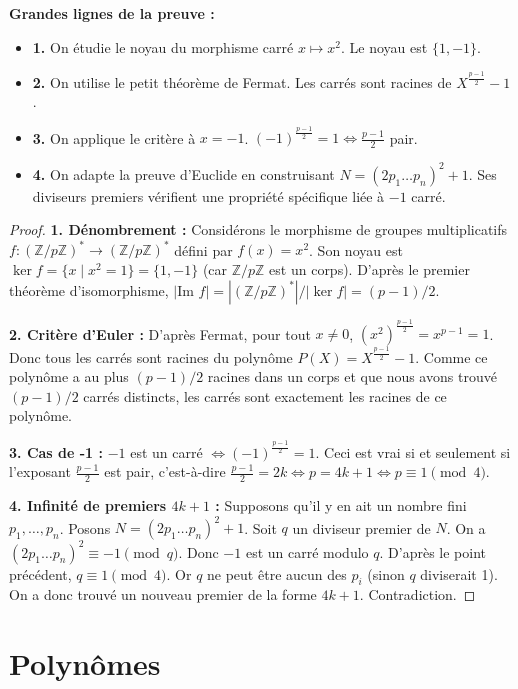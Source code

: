 \documentclass{prepacours}
\begin{document}
\noindent \textbf{Grandes lignes de la preuve :}
\begin{itemize}
    \item \textbf{1.} On étudie le noyau du morphisme carré $x \mapsto x^2$. Le noyau est $\{1, -1\}$.
    \item \textbf{2.} On utilise le petit théorème de Fermat. Les carrés sont racines de $X^{\frac{p-1}{2}} - 1$.
    \item \textbf{3.} On applique le critère à $x=-1$. $(-1)^{\frac{p-1}{2}} = 1 \iff \frac{p-1}{2}$ pair.
    \item \textbf{4.} On adapte la preuve d'Euclide en construisant $N = (2p_1 \dots p_n)^2 + 1$. Ses diviseurs premiers vérifient une propriété spécifique liée à $-1$ carré.
\end{itemize}

\begin{proof}
    \textbf{1. Dénombrement :} Considérons le morphisme de groupes multiplicatifs $f : (\mathbb{Z}/p\mathbb{Z})^* \to (\mathbb{Z}/p\mathbb{Z})^*$ défini par $f(x) = x^2$.
    Son noyau est $\ker f = \{x \mid x^2 = 1\} = \{1, -1\}$ (car $\mathbb{Z}/p\mathbb{Z}$ est un corps).
    D'après le premier théorème d'isomorphisme, $|\text{Im } f| = |(\mathbb{Z}/p\mathbb{Z})^*| / |\ker f| = (p-1)/2$.
    
    \textbf{2. Critère d'Euler :} D'après Fermat, pour tout $x \neq 0$, $(x^2)^{\frac{p-1}{2}} = x^{p-1} = 1$. Donc tous les carrés sont racines du polynôme $P(X) = X^{\frac{p-1}{2}} - 1$.
    Comme ce polynôme a au plus $(p-1)/2$ racines dans un corps et que nous avons trouvé $(p-1)/2$ carrés distincts, les carrés sont exactement les racines de ce polynôme.
    
    \textbf{3. Cas de -1 :} $-1$ est un carré $\iff (-1)^{\frac{p-1}{2}} = 1$.
    Ceci est vrai si et seulement si l'exposant $\frac{p-1}{2}$ est pair, c'est-à-dire $\frac{p-1}{2} = 2k \iff p = 4k+1 \iff p \equiv 1 \pmod 4$.
    
    \textbf{4. Infinité de premiers $4k+1$ :}
    Supposons qu'il y en ait un nombre fini $p_1, \dots, p_n$. Posons $N = (2 p_1 \dots p_n)^2 + 1$.
    Soit $q$ un diviseur premier de $N$. On a $(2 p_1 \dots p_n)^2 \equiv -1 \pmod q$.
    Donc $-1$ est un carré modulo $q$. D'après le point précédent, $q \equiv 1 \pmod 4$.
    Or $q$ ne peut être aucun des $p_i$ (sinon $q$ diviserait 1).
    On a donc trouvé un nouveau premier de la forme $4k+1$. Contradiction.
\end{proof}

\section{Polynômes}
\end{document}

